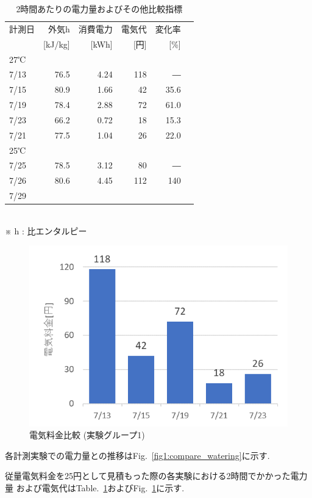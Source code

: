 \documentclass[a4j,fleqn,dvipdfmx,uplatex]{jsarticle}
\newcommand{\figref}[1]{Fig.\ \ref{#1}}
\newcommand{\tableref}[1]{Table.\ \ref{#1}}
\begin{document}
\begin{table}[htb]
  \caption{2時間あたりの電力量およびその他比較指標}
  \label{table:ex2}
  \centering
  \begin{tabular}{lrrrrr}
    \small 計測日 &   \small 外気h & \small 消費電力 & \small 電気代 & \small 変化率\\[-1.5mm]
    & \small [kJ/kg] & \small [kWh] & \small [円] & \small [\%] \\
    \hline \hline
    27℃ \\
    \hline
    7/13 & 76.5 & 4.24 & 118 & ― \\
    7/15 & 80.9 & 1.66 & 42 & 35.6 \\
    7/19 & 78.4 & 2.88 & 72 & 61.0 \\
    7/23 & 66.2 & 0.72 & 18 & 15.3 \\
    7/21 & 77.5 & 1.04 & 26 & 22.0 \\[2mm]
    25℃ \\
    \hline
    7/25 & 78.5 & 3.12 & 80 & ― \\
    7/26 & 80.6 & 4.45 & 112  & 140 \\
    7/29 &  &  &   &  \\
    \hline
  \end{tabular}\\
  ※ h : 比エンタルピー
\end{table}

\begin{figure}[htb]
  \centering
  \includegraphics[width=0.8\linewidth]{img/fee_27.png}
  \caption{電気料金比較 (実験グループ1)}
  \label{fig:fee_27}
\end{figure}

各計測実験での電力量との推移は\figref{fig1:compare_watering}に示す. 

従量電気料金を25円として見積もった際の各実験における2時間でかかった電力量
および電気代は\tableref{table:ex2}および\figref{fig:fee_27}に示す. 
\end{document}
